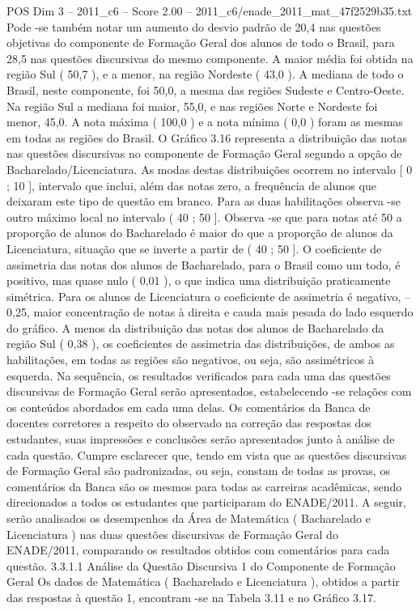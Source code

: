 \begin{textsample}{POS Dim 3 – 2011\_c6 – Score 2.00 – 2011\_c6/enade\_2011\_mat\_47f2529b35.txt}
Pode -se também notar um aumento do desvio padrão de 20,4 nas questões objetivas do componente de Formação Geral dos alunos de todo o Brasil, para 28,5 nas questões discursivas do mesmo componente.
A maior média foi obtida na região Sul ( 50,7 ), e a menor, na região Nordeste ( 43,0 ).
A mediana de todo o Brasil, neste componente, foi 50,0, a mesma das regiões Sudeste e Centro-Oeste.
Na região Sul a mediana foi maior, 55,0, e nas regiões Norte e Nordeste foi menor, 45,0.
A nota máxima ( 100,0 ) e a nota mínima ( 0,0 ) foram as mesmas em todas as regiões do Brasil.
O Gráfico 3.16 representa a distribuição das notas nas questões discursivas no componente de Formação Geral segundo a opção de Bacharelado/Licenciatura.
As modas destas distribuições ocorrem no intervalo [ 0 ; 10 ], intervalo que inclui, além das notas zero, a frequência de alunos que deixaram este tipo de questão em branco.
Para as duas habilitações observa -se outro máximo local no intervalo ( 40 ; 50 ].
Observa -se que para notas até 50 a proporção de alunos do Bacharelado é maior do que a proporção de alunos da Licenciatura, situação que se inverte a partir de ( 40 ; 50 ].
O coeficiente de assimetria das notas dos alunos de Bacharelado, para o Brasil como um todo, é positivo, mas quase nulo ( 0,01 ), o que indica uma distribuição praticamente simétrica.
Para os alunos de Licenciatura o coeficiente de assimetria é negativo, – 0,25, maior concentração de notas à direita e cauda mais pesada do lado esquerdo do gráfico.
A menos da distribuição das notas dos alunos de Bacharelado da região Sul ( 0,38 ), os coeficientes de assimetria das distribuições, de ambos as habilitações, em todas as regiões são negativos, ou seja, são assimétricos à esquerda.
Na sequência, os resultados verificados para cada uma das questões discursivas de Formação Geral serão apresentados, estabelecendo -se relações com os conteúdos abordados em cada uma delas.
Os comentários da Banca de docentes corretores a respeito do observado na correção das respostas dos estudantes, suas impressões e conclusões serão apresentados junto à análise de cada questão.
Cumpre esclarecer que, tendo em vista que as questões discursivas de Formação Geral são padronizadas, ou seja, constam de todas as provas, os comentários da Banca são os mesmos para todas as carreiras acadêmicas, sendo direcionados a todos os estudantes que participaram do ENADE/2011.
A seguir, serão analisados os desempenhos da Área de Matemática ( Bacharelado e Licenciatura ) nas duas questões discursivas de Formação Geral do ENADE/2011, comparando os resultados obtidos com comentários para cada questão. 3.3.1.1 Análise da Questão Discursiva 1 do Componente de Formação Geral Os dados de Matemática ( Bacharelado e Licenciatura ), obtidos a partir das respostas à questão 1, encontram -se na Tabela 3.11 e no Gráfico 3.17.

\end{textsample}
